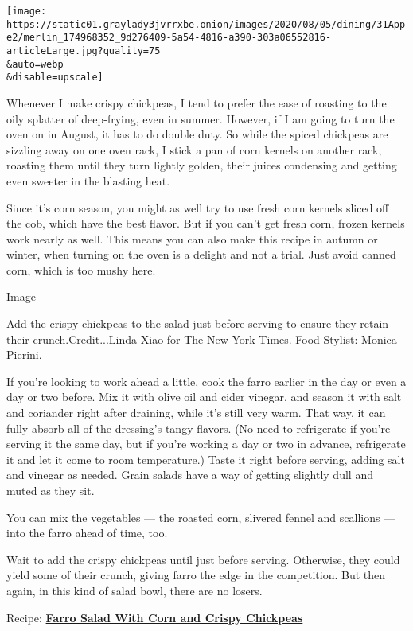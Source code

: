 \texttt{[image: https://static01.graylady3jvrrxbe.onion/images/2020/08/05/dining/31Appe2/merlin\_174968352\_9d276409-5a54-4816-a390-303a06552816-articleLarge.jpg?quality=75\\\&auto=webp\\\&disable=upscale]}

Whenever I make crispy chickpeas, I tend to prefer the ease of roasting
to the oily splatter of deep-frying, even in summer. However, if I am
going to turn the oven on in August, it has to do double duty. So while
the spiced chickpeas are sizzling away on one oven rack, I stick a pan
of corn kernels on another rack, roasting them until they turn lightly
golden, their juices condensing and getting even sweeter in the blasting
heat.

Since it's corn season, you might as well try to use fresh corn kernels
sliced off the cob, which have the best flavor. But if you can't get
fresh corn, frozen kernels work nearly as well. This means you can also
make this recipe in autumn or winter, when turning on the oven is a
delight and not a trial. Just avoid canned corn, which is too mushy
here.

Image

Add the crispy chickpeas to the salad just before serving to ensure they
retain their crunch.Credit...Linda Xiao for The New York Times. Food
Stylist: Monica Pierini.

If you're looking to work ahead a little, cook the farro earlier in the
day or even a day or two before. Mix it with olive oil and cider
vinegar, and season it with salt and coriander right after draining,
while it's still very warm. That way, it can fully absorb all of the
dressing's tangy flavors. (No need to refrigerate if you're serving it
the same day, but if you're working a day or two in advance, refrigerate
it and let it come to room temperature.) Taste it right before serving,
adding salt and vinegar as needed. Grain salads have a way of getting
slightly dull and muted as they sit.

You can mix the vegetables --- the roasted corn, slivered fennel and
scallions --- into the farro ahead of time, too.

Wait to add the crispy chickpeas until just before serving. Otherwise,
they could yield some of their crunch, giving farro the edge in the
competition. But then again, in this kind of salad bowl, there are no
losers.

Recipe:
\textbf{\href{https://cooking.nytimes3xbfgragh.onion/recipes/1021304-farro-salad-with-corn-and-crispy-chickpeas}{Farro
Salad With Corn and Crispy Chickpeas}}


